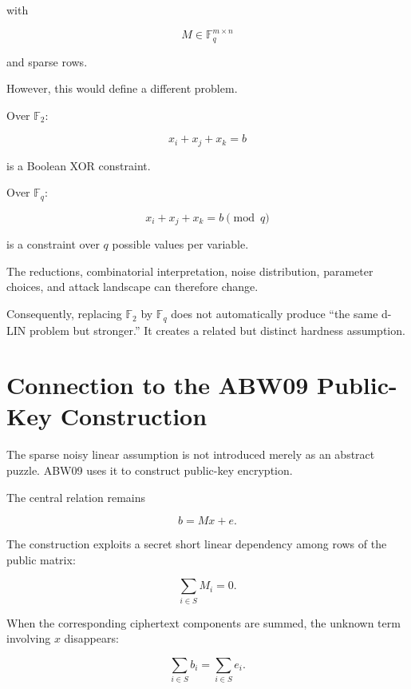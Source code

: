 \documentclass[11pt,a4paper]{article}
\newcommand{\F}{\mathbb{F}}
\begin{document}
with

\begin{equation}
    M\in\F_q^{m\times n}
\end{equation}

and sparse rows.

However, this would define a different problem.

Over $\F_2$:

\begin{equation}
    x_i+x_j+x_k=b
\end{equation}

is a Boolean XOR constraint.

Over $\F_q$:

\begin{equation}
    x_i+x_j+x_k=b\pmod q
\end{equation}

is a constraint over $q$ possible values per variable.

The reductions, combinatorial interpretation, noise distribution,
parameter choices, and attack landscape can therefore change.

Consequently, replacing $\F_2$ by $\F_q$ does not automatically produce
``the same d-LIN problem but stronger.'' It creates a related but
distinct hardness assumption.

\section{Connection to the ABW09 Public-Key Construction}

The sparse noisy linear assumption is not introduced merely as an
abstract puzzle. ABW09 uses it to construct public-key encryption.

The central relation remains

\begin{equation}
    b=Mx+e.
\end{equation}

The construction exploits a secret short linear dependency among
rows of the public matrix:

\begin{equation}
    \sum_{i\in S}M_i=0.
\end{equation}

When the corresponding ciphertext components are summed, the
unknown term involving $x$ disappears:

\begin{equation}
    \sum_{i\in S}b_i
    =
    \sum_{i\in S}e_i.
\end{equation}
\end{document}

